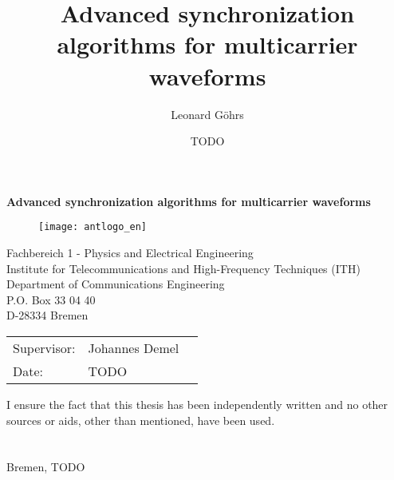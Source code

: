 \thispagestyle{empty}
\title{Advanced synchronization algorithms for multicarrier waveforms}
\author{Leonard Göhrs}
\date{TODO}

\begin{titlepage}
  \noindent

  \vspace{55 mm}

  \begin{center}
    \begin{huge}
      \textbf{Advanced synchronization algorithms for multicarrier waveforms}
    \end{huge}
  \end{center}

  \vspace{55 mm}

  \begin{figure}[H]
    \centering
    \texttt{[image: antlogo\_en]}
    \\
    \label{img:FrontPage}
  \end{figure}

  \begin{center}
    Fachbereich 1 - Physics and Electrical Engineering \\
    Institute for Telecommunications and High-Frequency Techniques (ITH) \\
    Department of Communications Engineering \\
    P.O. Box 33 04 40 \\
    D-28334 Bremen \\
  \end{center}

  \vfill

  \begin{center}
    \begin{tabular}{lll}
      Supervisor: & Johannes Demel \\
      Date: & TODO
    \end{tabular}
  \end{center}

  \vspace{5mm}
  \noindent I ensure the fact that this thesis has been independently written and no other
  sources or aids, other than mentioned, have been used. \\ \\ \\
  Bremen, TODO \hspace{5mm} \hrulefill

  \newpage
\end{titlepage}
